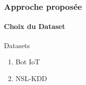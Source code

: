 \documentclass[aspectratio=169,professionalfonts, 12pt]{beamer}
\begin{document}
\begin{frame}
\frametitle{Approche proposée}
\framesubtitle{Choix du Dataset}
\begin{minipage}{0.3\textwidth}
	\begin{block}{Datasets}
		\begin{enumerate}
			 \item<1> Bot IoT
			 \item<2> NSL-KDD  
		\end{enumerate}
	\end{block}
\end{minipage}
\textbf{}
\begin{minipage}{0.6\textwidth}
\end{minipage}
\end{frame} 
\end{document}

